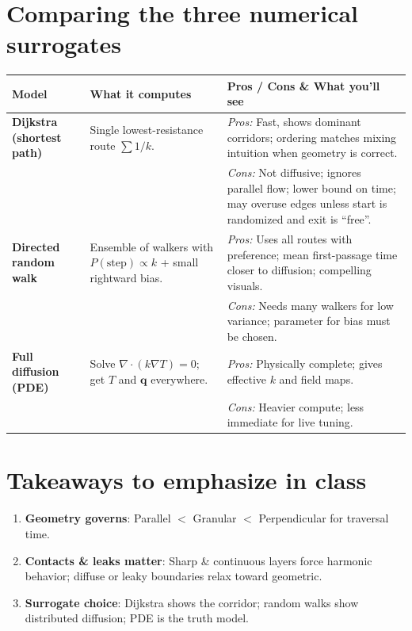 \documentclass[11pt,a4paper]{article}
\begin{document}
\section{Comparing the three numerical surrogates}
\begin{center}
\renewcommand{\arraystretch}{1.2}
\begin{tabular}{@{}p{3.3cm}p{5.1cm}p{5.8cm}@{}}
\toprule
\textbf{Model} & \textbf{What it computes} & \textbf{Pros / Cons \& What you'll see} \\
\midrule
\textbf{Dijkstra (shortest path)} &
Single lowest-resistance route $\sum 1/k$. &
\emph{Pros:} Fast, shows dominant corridors; ordering matches mixing intuition when geometry is correct. \\
& & \emph{Cons:} Not diffusive; ignores parallel flow; lower bound on time; may overuse edges unless start is randomized and exit is “free”. \\
\midrule
\textbf{Directed random walk} &
Ensemble of walkers with $P(\text{step})\propto k$ + small rightward bias. &
\emph{Pros:} Uses all routes with preference; mean first-passage time closer to diffusion; compelling visuals. \\
& & \emph{Cons:} Needs many walkers for low variance; parameter for bias must be chosen. \\
\midrule
\textbf{Full diffusion (PDE)} &
Solve $\nabla\!\cdot(k\nabla T)=0$; get $T$ and $\bm q$ everywhere. &
\emph{Pros:} Physically complete; gives effective $k$ and field maps. \\
& & \emph{Cons:} Heavier compute; less immediate for live tuning. \\
\bottomrule
\end{tabular}
\end{center}

\section*{Takeaways to emphasize in class}
\begin{enumerate}[leftmargin=*]
\item \textbf{Geometry governs}: Parallel $<$ Granular $<$ Perpendicular for traversal time.
\item \textbf{Contacts \& leaks matter}: Sharp \& continuous layers force harmonic behavior; diffuse or leaky boundaries relax toward geometric.
\item \textbf{Surrogate choice}: Dijkstra shows the corridor; random walks show distributed diffusion; PDE is the truth model.
\end{enumerate}
\end{document}
